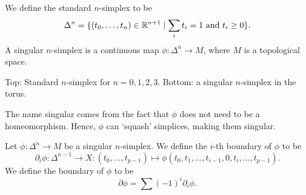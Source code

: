 \begin{definition}
    We define the standard $n$-simplex to be \[\Delta^{n} = \{(t_0, \ldots, t_n) \in \mathbb{R}^{n+1}  \mid  \sum_i t_i = 1 \text{ and }  t_i \ge  0\}.\]
    A singular $n$-simplex is a continuous map $\phi: \Delta^{n} \to M$, where $M$ is a topological space. 
\end{definition}
\begin{marginfigure}
    \centering
    \caption{Top: Standard $n$-simplex for $n = 0, 1, 2, 3$. Bottom: a singular $n$-simplex in the torus.}
    \label{fig:definition-simplex}
\end{marginfigure}
\begin{remark}
    The name singular comes from the fact that $\phi$ does not need to be a homeomorphism.
    Hence, $\phi$ can `squash' simplices, making them singular.
\end{remark}
\begin{definition}
    Let $\phi: \Delta^{n} \to  M$ be a singular $n$-simplex.
    We define the $i$-th boundary of $\phi$ to be
    \[
        \partial_i \phi: \Delta^{n-1} \to  X: (t_0, \ldots, t_{p-1}) \mapsto \phi(t_0, t_1, \ldots, t_{i-1}, 0, t_i, \ldots, t_{p-1})
    .\] 
    We define the boundary of $\phi$ to be
     \[
         \partial \phi = \sum (-1)^{i} \partial_i \phi
    .\] 
\end{definition}
\begin{figure}[H]
    \centering
\end{figure}

